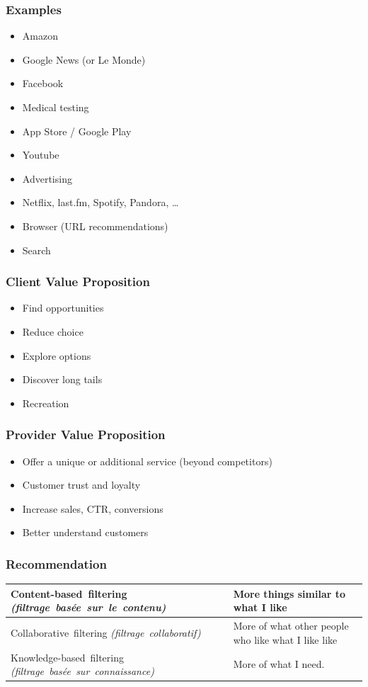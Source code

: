 \begin{frame}
  \frametitle{Examples}
  \begin{itemize}
  \item Amazon
  \item Google News (or Le Monde)
  \item Facebook
  \item Medical testing
  \item App Store / Google Play
  \item Youtube
  \item Advertising
  \item Netflix, last.fm, Spotify, Pandora, \dots
  \item Browser (URL recommendations)
  \item Search
  \end{itemize}
\end{frame}

\begin{frame}
  \frametitle{Client Value Proposition}
  \begin{itemize}
  \item Find opportunities
  \item Reduce choice
  \item Explore options
  \item Discover long tails
  \item Recreation
  \end{itemize}
\end{frame}

\begin{frame}
  \frametitle{Provider Value Proposition}

  \begin{itemize}
  \item Offer a unique or additional service (beyond competitors)
  \item Customer trust and loyalty
  \item Increase sales, CTR, conversions
  \item Better understand customers
  \end{itemize}
\end{frame}


\begin{frame}
  \frametitle{Recommendation}

  \begin{tabular}{|p{5.7cm}|p{4cm}|}
    \hline
    \topstrut\hbox{Content-based filtering}
    \hbox{\it (filtrage basée sur le contenu)}
    &
    More things similar to what I like\bottomstrut
    \\
    \hline
    \topstrut\hbox{Collaborative filtering}
    \hbox{\it (filtrage collaboratif)}
    &
    More of what other people who like what I like like
    \bottomstrut
    \\
    \hline
    \topstrut\hbox{Knowledge-based filtering}
    \hbox{\it (filtrage basée sur connaissance)}\bottomstrut
    &
    More of what I need.\bottomstrut
    \\
    \hline
  \end{tabular}
\end{frame}


